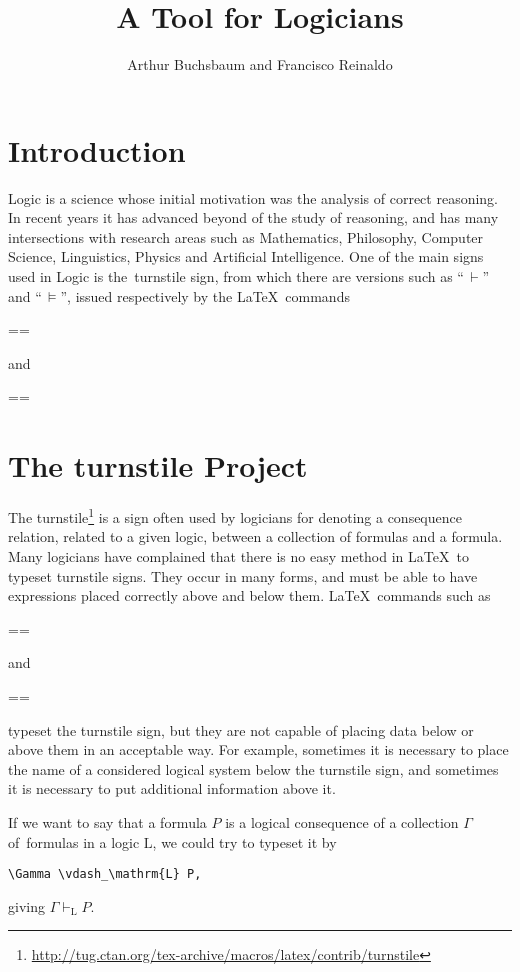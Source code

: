 \documentclass{pracjourn}
\title{A Tool for Logicians}
\author{Arthur Buchsbaum and Francisco Reinaldo}
\begin{document}
\maketitle

\section{Introduction}

Logic is a science whose initial motivation was the analysis of correct reasoning. In recent years it has advanced beyond of the study of reasoning, and has many intersections with research areas such as Mathematics, Philosophy, Computer Science, Linguistics, Physics and Artificial Intelligence. One of the main signs used in Logic is the~turnstile sign, from which there are versions such as ``$\,\vdash$'' and ``$\,\models$'', issued respectively by the \LaTeX\ commands \begin{verb}=\vdash=\end{verb} and \begin{verb}=\models=\end{verb}

\section{The turnstile Project} %
\label{sec:turnstile_project}

The turnstile\footnote{\url{http://tug.ctan.org/tex-archive/macros/latex/contrib/turnstile}} is a sign often used by logicians for denoting a consequence relation, related to a given logic, between a collection of formulas and a formula. Many logicians have complained that there is no easy method in \LaTeX\ to typeset turnstile signs.  They occur in many forms, and must be able to have expressions placed correctly above and below them. \LaTeX\ commands such as \begin{verb}=\vdash=\end{verb} and \begin{verb}=\models=\end{verb} typeset the turnstile sign, but they are not capable of placing data below or above them in an acceptable way. For example, sometimes it is necessary to place the name of a considered logical system below the turnstile sign, and sometimes it is necessary to put additional information above it.

\vspace{0.2em}

If we want to say that a formula $P$ is a logical consequence of a collection $\Gamma$ of~formulas in a logic $\mathrm{L}$, we could try to typeset it by \begin{verbatim}\Gamma \vdash_\mathrm{L} P,\end{verbatim} giving $\Gamma \vdash_\mathrm{L} P$.
\end{document}
